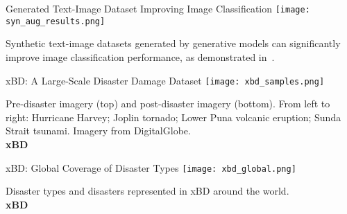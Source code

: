 \begin{refsection}
  \begin{frame}{Generated Text-Image Dataset Improving Image Classification}
    \centering
    \texttt{[image: syn\_aug\_results.png]}
    
    
    \scriptsize
    Synthetic text-image datasets generated by generative models can significantly improve image classification performance, as demonstrated in~\parencite{heSYNTHETICDATAGENERATIVE2022}.
    \bottomleftrefs
  \end{frame}
\end{refsection}

\begin{refsection}
  \begin{frame}{xBD: A Large-Scale Disaster Damage Dataset}
    \centering
    \texttt{[image: xbd\_samples.png]}
    
    \vspace{0.5em}
    \scriptsize
    Pre-disaster imagery (top) and post-disaster imagery (bottom). From left to right: Hurricane Harvey; Joplin tornado; Lower Puna volcanic eruption; Sunda Strait tsunami. Imagery from DigitalGlobe.\\
    \textbf{xBD}~\parencite{guptaCreatingXBDDataset2019}
    \bottomleftrefs
  \end{frame}
\end{refsection}

\begin{refsection}
  \begin{frame}{xBD: Global Coverage of Disaster Types}
    \centering
    \texttt{[image: xbd\_global.png]}
    
    \vspace{0.5em}
    \scriptsize
    Disaster types and disasters represented in xBD around the world.\\
    \textbf{xBD}~\parencite{guptaCreatingXBDDataset2019}
    \bottomleftrefs
  \end{frame}
\end{refsection}

